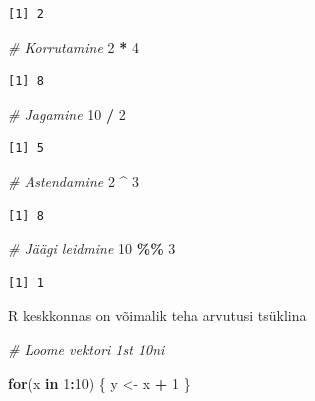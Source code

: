 \documentclass[
]{book}
\newenvironment{Shaded}{\begin{snugshade}}{\end{snugshade}}
\newcommand{\CommentTok}[1]{\textcolor[rgb]{0.56,0.35,0.01}{\textit{#1}}}
\newcommand{\ControlFlowTok}[1]{\textcolor[rgb]{0.13,0.29,0.53}{\textbf{#1}}}
\newcommand{\DecValTok}[1]{\textcolor[rgb]{0.00,0.00,0.81}{#1}}
\newcommand{\NormalTok}[1]{#1}
\newcommand{\OtherTok}[1]{\textcolor[rgb]{0.56,0.35,0.01}{#1}}
\newcommand{\SpecialCharTok}[1]{\textcolor[rgb]{0.81,0.36,0.00}{\textbf{#1}}}
\renewenvironment{Shaded} {\begin{snugshade}\footnotesize} {\end{snugshade}}
\theoremstyle{definition}
\theoremstyle{definition}
\theoremstyle{definition}
\theoremstyle{definition}
\theoremstyle{remark}
\begin{document}
\begin{verbatim}
[1] 2
\end{verbatim}

\begin{Shaded}
\begin{Highlighting}[]
\CommentTok{\# Korrutamine}
\DecValTok{2} \SpecialCharTok{*} \DecValTok{4}
\end{Highlighting}
\end{Shaded}

\begin{verbatim}
[1] 8
\end{verbatim}

\begin{Shaded}
\begin{Highlighting}[]
\CommentTok{\# Jagamine}
\DecValTok{10} \SpecialCharTok{/} \DecValTok{2}
\end{Highlighting}
\end{Shaded}

\begin{verbatim}
[1] 5
\end{verbatim}

\begin{Shaded}
\begin{Highlighting}[]
\CommentTok{\# Astendamine}
\DecValTok{2} \SpecialCharTok{\^{}} \DecValTok{3}
\end{Highlighting}
\end{Shaded}

\begin{verbatim}
[1] 8
\end{verbatim}

\begin{Shaded}
\begin{Highlighting}[]
\CommentTok{\# Jäägi leidmine}
\DecValTok{10} \SpecialCharTok{\%\%} \DecValTok{3}
\end{Highlighting}
\end{Shaded}

\begin{verbatim}
[1] 1
\end{verbatim}

R keskkonnas on võimalik teha arvutusi tsüklina

\begin{Shaded}
\begin{Highlighting}[]
\CommentTok{\# Loome vektori 1st 10ni}

\ControlFlowTok{for}\NormalTok{(x }\ControlFlowTok{in} \DecValTok{1}\SpecialCharTok{:}\DecValTok{10}\NormalTok{)}
\NormalTok{\{}
\NormalTok{  y }\OtherTok{\textless{}{-}}\NormalTok{ x }\SpecialCharTok{+} \DecValTok{1}
\NormalTok{\}}
\end{Highlighting}
\end{Shaded}
\end{document}
